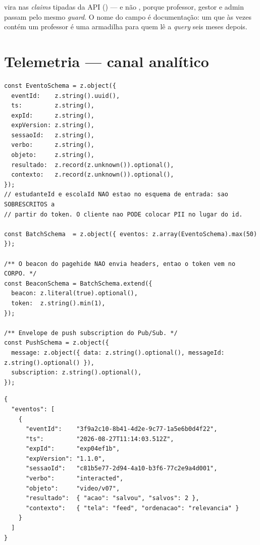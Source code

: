 \begin{nota}
 vira  nas \emph{claims} tipadas da API
() --- e não , porque professor, gestor e
admin passam pelo mesmo \emph{guard}. O nome do campo é documentação: um
 que às vezes contém um professor é uma armadilha para quem lê a
\emph{query} seis meses depois.
\end{nota}

\section{Telemetria --- canal analítico}

\begin{lstlisting}[language=tsunoo, caption={\arq{src/telemetry/telemetry.controller.ts} --- os esquemas}]
const EventoSchema = z.object({
  eventId:    z.string().uuid(),
  ts:         z.string(),
  expId:      z.string(),
  expVersion: z.string(),
  sessaoId:   z.string(),
  verbo:      z.string(),
  objeto:     z.string(),
  resultado:  z.record(z.unknown()).optional(),
  contexto:   z.record(z.unknown()).optional(),
});
// estudanteId e escolaId NAO estao no esquema de entrada: sao SOBRESCRITOS a
// partir do token. O cliente nao PODE colocar PII no lugar do id.

const BatchSchema  = z.object({ eventos: z.array(EventoSchema).max(50) });

/** O beacon do pagehide NAO envia headers, entao o token vem no CORPO. */
const BeaconSchema = BatchSchema.extend({
  beacon: z.literal(true).optional(),
  token:  z.string().min(1),
});

/** Envelope de push subscription do Pub/Sub. */
const PushSchema = z.object({
  message: z.object({ data: z.string().optional(), messageId: z.string().optional() }),
  subscription: z.string().optional(),
});
\end{lstlisting}

\begin{lstlisting}[language=jsonunoo, caption={\rota{POST /telemetry/batch} --- corpo}]
{
  "eventos": [
    {
      "eventId":    "3f9a2c10-8b41-4d2e-9c77-1a5e6b0d4f22",
      "ts":         "2026-08-27T11:14:03.512Z",
      "expId":      "exp04ef1b",
      "expVersion": "1.1.0",
      "sessaoId":   "c81b5e77-2d94-4a10-b3f6-77c2e9a4d001",
      "verbo":      "interacted",
      "objeto":     "video/v07",
      "resultado":  { "acao": "salvou", "salvos": 2 },
      "contexto":   { "tela": "feed", "ordenacao": "relevancia" }
    }
  ]
}
\end{lstlisting}

